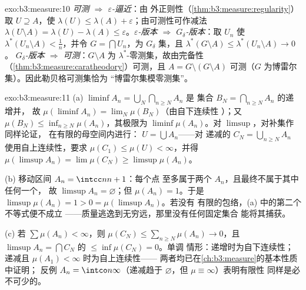 \begin{solution}{exo:b3:measure:10}
\emph{可测 $\Rightarrow$ $\varepsilon$-逼近}：由
外正则性（\cref{thm:b3:measure:regularity}）取
$U \supseteq A$，使 $\lambda(U) \leq \lambda(A) +
\varepsilon$；由可测性可作减法
$\lambda(U\setminus A) = \lambda(U) - \lambda(A) \leq
\varepsilon$。\emph{$\varepsilon$-版本 $\Rightarrow$
$G_\delta$-版本}：取 $U_n$ 使 $\lambda^*(U_n\setminus
A) < \frac1n$，并令 $G = \bigcap U_n$，为 $G_\delta$ 集，且
$\lambda^*(G\setminus A) \leq \lambda^*(U_n\setminus A) \to 0$。
\emph{$G_\delta$-版本 $\Rightarrow$ 可测}：$G\setminus
A$ 为 $\lambda^*$-零测集，故由完备性
（\cref{thm:b3:measure:caratheodory}）可测，且 $A = G \setminus
(G\setminus A)$ 可测（$G$ 为博雷尔集）。因此勒贝格可测集恰为
“博雷尔集模零测集”。
\end{solution}

\begin{solution}{exo:b3:measure:11}
(a) $\liminf A_n = \bigcup_N\bigcap_{n\geq N}A_n$ 是
集合 $B_N = \bigcap_{n\geq N}A_n$ 的递增并，
故 $\mu(\liminf A_n) = \lim_N\mu(B_N)$（由自下连续性
）；又 $\mu(B_N) \leq \inf_{n \geq N}\mu(A_n)$，其极限为
$\liminf\mu(A_n)$。对 $\limsup$，对补集作同样论证，
在有限的母空间内进行：
$U = \bigcup A_n$——对
递减的 $C_N = \bigcup_{n\geq N}A_n$ 使用自上连续性，要求 $\mu(C_1)
\leq \mu(U) < \infty$，并得 $\mu(\limsup A_n) =
\lim\mu(C_N) \geq \limsup\mu(A_n)$。

(b) 移动区间 $A_n = \intcc n{n+1}$：每个点
至多属于两个 $A_n$，且最终不属于其中任何一个，
故 $\limsup A_n = \varnothing$；但 $\mu(A_n) = 1$。于是
$\limsup\mu(A_n) = 1 > 0 = \mu(\limsup A_n)$。若没有
有限的包络，(a) 中的第二个不等式便不成立
——质量逃逸到无穷远，那里没有任何固定集合
能将其捕获。

(c) 若 $\sum\mu(A_n) < \infty$，则 $\mu(C_N) \leq
\sum_{n\geq N}\mu(A_n) \to 0$，且 $\limsup A_n =
\bigcap C_N$ 的 $\leq \inf\mu(C_N) = 0$。单调
情形：递增时为自下连续性；递减且
$\mu(A_1) < \infty$ 时为自上连续性——
两者均已在\cref{ch:b3:measure}的基本性质中证明；
反例 $A_n = \intco n\infty$（递减趋于
$\varnothing$，但 $\mu \equiv \infty$）表明有限性
同样是必不可少的。
\end{solution}

